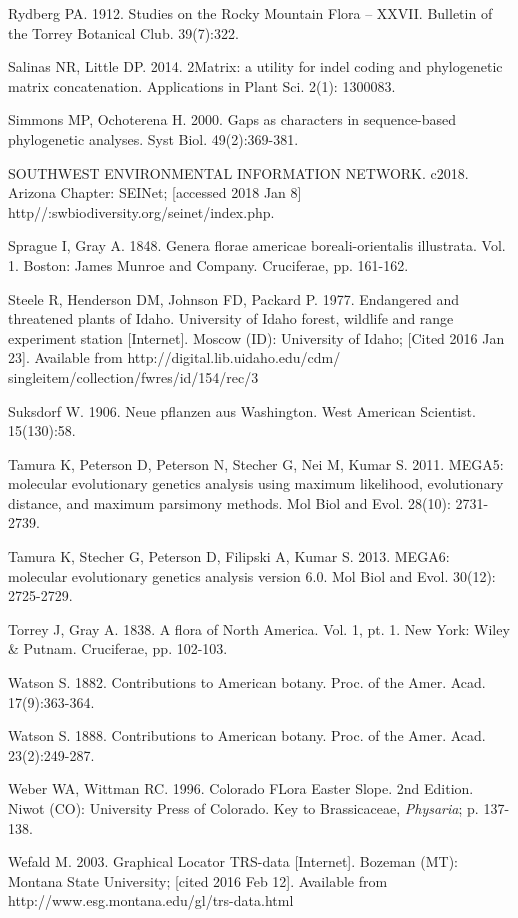 Rydberg PA. 1912. Studies on the Rocky Mountain Flora – XXVII. Bulletin of the Torrey Botanical Club. 39(7):322.

Salinas NR, Little DP. 2014. 2Matrix: a utility for indel coding and phylogenetic matrix concatenation. Applications in Plant Sci. 2(1): 1300083.

Simmons MP, Ochoterena H. 2000. Gaps as characters in sequence-based phylogenetic analyses. Syst Biol. 49(2):369-381.

SOUTHWEST ENVIRONMENTAL INFORMATION NETWORK. c2018. Arizona Chapter: SEINet; [accessed 2018 Jan 8] http//:swbiodiversity.org/seinet/index.php.

Sprague I, Gray A. 1848. Genera florae americae boreali-orientalis illustrata.  Vol. 1. Boston: James Munroe and Company. Cruciferae, pp. 161-162.  

Steele R, Henderson DM, Johnson FD, Packard P. 1977. Endangered and threatened plants of Idaho. University of Idaho forest, wildlife and range experiment station [Internet]. Moscow (ID): University of Idaho; [Cited 2016 Jan 23]. Available from http://digital.lib.uidaho.edu/cdm/ singleitem/collection/fwres/id/154/rec/3

Suksdorf W. 1906. Neue pflanzen aus Washington. West American Scientist. 15(130):58.

Tamura K, Peterson D, Peterson N, Stecher G, Nei M, Kumar S. 2011. MEGA5: molecular evolutionary genetics analysis using maximum likelihood, evolutionary distance, and maximum parsimony methods. Mol Biol and Evol. 28(10): 2731-2739.

Tamura K, Stecher G, Peterson D, Filipski A, Kumar S. 2013. MEGA6: molecular evolutionary genetics analysis version 6.0. Mol Biol and Evol. 30(12): 2725-2729.

Torrey J, Gray A. 1838. A flora of North America. Vol. 1, pt. 1. New York: Wiley \& Putnam. Cruciferae, pp. 102-103.
  
Watson S. 1882. Contributions to American botany. Proc. of the Amer. Acad. 17(9):363-364.

Watson S. 1888. Contributions to American botany. Proc. of the Amer. Acad. 23(2):249-287.

Weber WA, Wittman RC. 1996. Colorado FLora Easter Slope. 2nd Edition. Niwot (CO): University Press of Colorado. Key to Brassicaceae, \textit{Physaria}; p. 137-138.

Wefald M. 2003. Graphical Locator TRS-data [Internet]. Bozeman (MT): Montana State University; [cited 2016 Feb 12]. Available from http://www.esg.montana.edu/gl/trs-data.html

